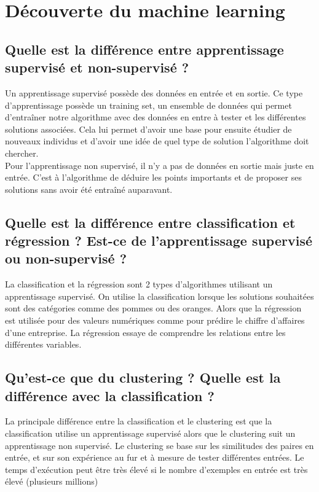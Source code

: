\chapter{Découverte du machine learning}
\section{Quelle est la différence entre apprentissage supervisé et non-supervisé ?}
Un apprentissage supervisé possède des données en entrée et en sortie. Ce type d’apprentissage possède un training set, un ensemble de données qui permet d’entraîner notre algorithme avec des données en entre à tester et les différentes solutions associées. Cela lui permet d’avoir une base pour ensuite étudier de nouveaux individus et d’avoir une idée de quel type de solution l’algorithme doit chercher.\\

Pour l’apprentissage non supervisé, il n’y a pas de données en sortie mais juste en entrée. C’est à l’algorithme de déduire les points importants et de proposer ses solutions sans avoir été entraîné auparavant.

\section{Quelle est la différence entre classification et régression ? Est-ce de l’apprentissage supervisé ou non-supervisé ?}
La classification et la régression sont 2 types d’algorithmes utilisant un apprentissage supervisé. On utilise la classification lorsque les solutions souhaitées sont des catégories comme des pommes ou des oranges. Alors que la régression est utilisée pour des valeurs numériques comme pour prédire le chiffre d’affaires d’une entreprise. La régression essaye de comprendre les relations entre les différentes variables.


\section{Qu’est-ce que du clustering ? Quelle est la différence avec la classification ?}
La principale différence entre la classification et le clustering est que la classification utilise un apprentissage supervisé alors que le clustering suit un apprentissage non supervisé. Le clustering se base sur les similitudes des paires en entrée, et sur son expérience au fur et à mesure de tester différentes entrées. Le temps d’exécution peut être très élevé si le nombre d’exemples en entrée est très élevé (plusieurs millions)

